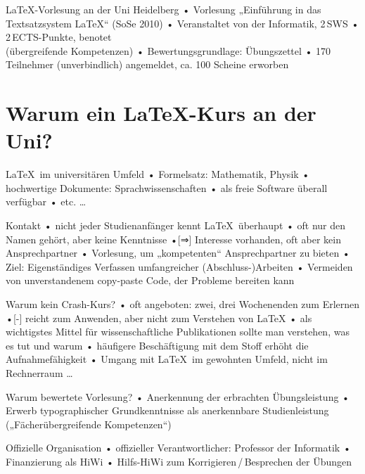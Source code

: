 \documentclass[t]{beamer}
\begin{document}
\begin{frame}{\LaTeX-Vorlesung an der Uni Heidelberg}
• Vorlesung „Einführung in das Textsatzsystem \LaTeX“ (SoSe 2010)
• Veranstaltet von der Informatik, 2\,SWS
• 2\,ECTS-Punkte, benotet\\%
(übergreifende Kompetenzen)
• Bewertungsgrundlage: Übungszettel
• 170 Teilnehmer (unverbindlich) angemeldet, ca. 100 Scheine erworben
\•
\end{frame}

\section{Warum ein \LaTeX-Kurs an der Uni?}
\begin{frame}{\LaTeX\ im universitären Umfeld}
• Formelsatz: Mathematik, Physik
• hochwertige Dokumente: Sprachwissenschaften
• als freie Software überall verfügbar
• etc. … 
\•
\end{frame}

\begin{frame}{Kontakt}
• nicht jeder Studienanfänger kennt \LaTeX\ überhaupt
• oft nur den Namen gehört, aber keine Kenntnisse
•[⇒] Interesse vorhanden, oft aber kein Ansprechpartner\pause
• Vorlesung, um „kompetenten“ Ansprechpartner zu bieten
• Ziel: Eigenständiges Verfassen umfangreicher (Abschluss-)Arbeiten
• Vermeiden von unverstandenem copy-paste Code, der Probleme bereiten kann
\•
\end{frame}

\begin{frame}{Warum kein Crash-Kurs?}
• oft angeboten: zwei, drei Wochenenden zum Erlernen
•[-] reicht zum Anwenden, aber nicht zum Verstehen von \LaTeX
• als wichtigstes Mittel für wissenschaftliche Publikationen sollte man verstehen, was es tut und warum
• häufigere Beschäftigung mit dem Stoff erhöht die Aufnahmefähigkeit
• Umgang mit \LaTeX\ im gewohnten Umfeld, nicht im Rechnerraum …
\•
\end{frame}

\begin{frame}{Warum bewertete Vorlesung?}
• Anerkennung der erbrachten Übungsleistung
• Erwerb typographischer Grundkenntnisse als anerkennbare Studienleistung („Fächerübergreifende Kompetenzen“)
\•
\end{frame}

\begin{frame}{Offizielle Organisation}
• offizieller Verantwortlicher: Professor der Informatik
• Finanzierung als HiWi
• Hilfs-HiWi zum Korrigieren\,/\,Besprechen der Übungen
\•
\end{frame}
\end{document}
